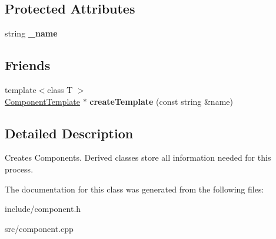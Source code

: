 \subsection*{\-Protected \-Attributes}
\begin{DoxyCompactItemize}
\item 
\hypertarget{classComponentTemplate_abbad3c585c5e8af3d812e83b5752e483}{
string {\bfseries \-\_\-name}}
\label{d9/d38/classComponentTemplate_abbad3c585c5e8af3d812e83b5752e483}

\end{DoxyCompactItemize}
\subsection*{\-Friends}
\begin{DoxyCompactItemize}
\item 
\hypertarget{classComponentTemplate_a0c3e6f2c47e603302a2f708067cdf487}{
{\footnotesize template$<$class T $>$ }\\\hyperlink{classComponentTemplate}{\-Component\-Template} $\ast$ {\bfseries create\-Template} (const string \&name)}
\label{d9/d38/classComponentTemplate_a0c3e6f2c47e603302a2f708067cdf487}

\end{DoxyCompactItemize}


\subsection{\-Detailed \-Description}
\-Creates \-Components. \-Derived classes store all information needed for this process. 

\-The documentation for this class was generated from the following files\-:\begin{DoxyCompactItemize}
\item 
include/component.\-h\item 
src/component.\-cpp\end{DoxyCompactItemize}
